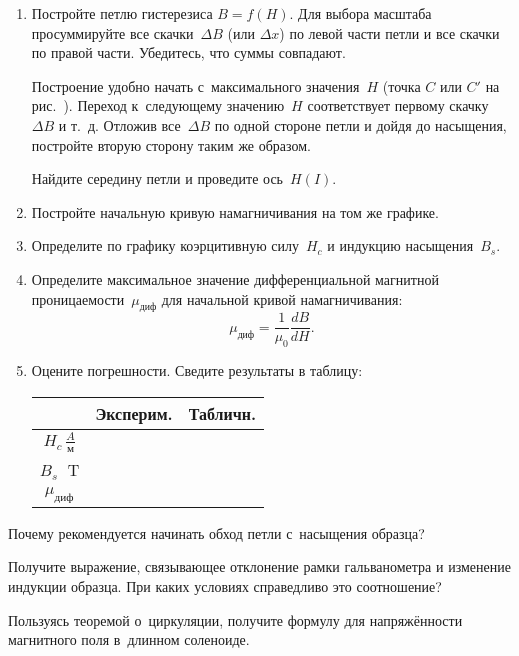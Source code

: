 \begin{lab:task}
\begin{enumerate}
		\item Постройте петлю гистерезиса $B=f(H)$. Для выбора масштаба просуммируйте все скачки~$\Delta B$ (или $\Delta x$) по левой части
		петли и все скачки по правой части. Убедитесь, что суммы совпадают.
		
		Построение удобно начать с~максимального значения~$H$ (точка $C$ или $C'$ на рис.~). Переход к~следующему значению~$H$
		соответствует первому скачку~$\Delta B$ и т.~д. Отложив все~$\Delta B$ по одной стороне петли и дойдя до насыщения, постройте
		вторую сторону таким же образом.
		
		Найдите середину петли и проведите ось~$H(I)$.
		
		\item Постройте начальную кривую намагничивания на том же графике.
		
		\item Определите по графику коэрцитивную силу~$H_c$ и индукцию насыщения~$B_s$.
		
		\item Определите максимальное значение дифференциальной магнитной проницаемости~$\mu_\text{диф}$ для начальной кривой
		намагничивания:
		\begin{equation*}
			\mu_\text{диф}=\frac{1}{\mu_0}\frac{dB}{dH}.
		\end{equation*}
		
		\item Оцените погрешности. Сведите результаты в таблицу:
		
		\begin{center}
		\begin{tabular}{|c|c|c|}
		\hline
		&Эксперим.&Табличн.\\
		\hline\hline
		$H_c\,\frac{A}{\text{м}}$& & \\
		$B_s\;$ T & & \\
		$\mu_\text{диф}$ & & \\
		\hline
		\end{tabular}
		\end{center}

	\end{enumerate}

\end{lab:task}

\begin{lab:questions}
	
	\item Почему рекомендуется начинать обход петли с~насыщения образца?
	
	\item Получите выражение, связывающее отклонение рамки гальванометра и изменение индукции образца. При каких условиях
	справедливо это соотношение?
	
	\item Пользуясь теоремой о~циркуляции, получите формулу для напряжённости магнитного поля в~длинном соленоиде.

\end{lab:questions}

